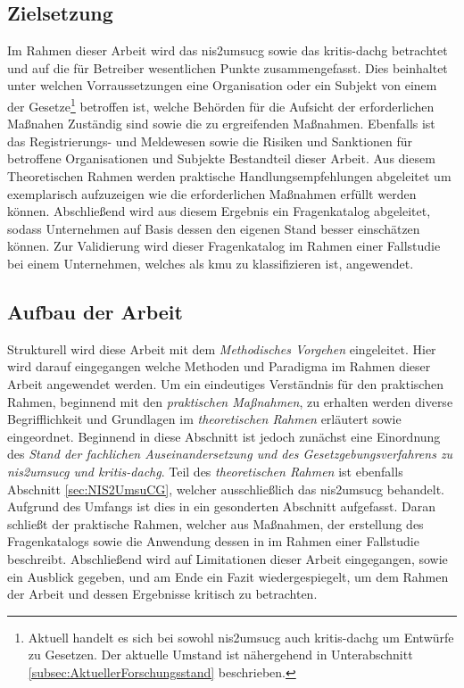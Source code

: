 \documentclass[11pt,a4paper,hidelinks]{article}   %
\begin{document}
    \subsection{Zielsetzung}                                                                %
        Im Rahmen dieser Arbeit wird das \gls{nis2umsucg} sowie das \gls{kritis-dachg} betrachtet und auf die für Betreiber wesentlichen Punkte zusammengefasst. Dies beinhaltet unter welchen Vorraussetzungen eine Organisation oder ein Subjekt von einem der Gesetze\footnote{Aktuell handelt es sich bei sowohl \gls{nis2umsucg} auch \gls{kritis-dachg} um Entwürfe zu Gesetzen. Der aktuelle Umstand ist nähergehend in Unterabschnitt \ref{subsec:AktuellerForschungsstand} beschrieben.} betroffen ist, welche Behörden für die Aufsicht der erforderlichen Maßnahen Zuständig sind sowie die zu ergreifenden Maßnahmen. Ebenfalls ist das Registrierungs- und Meldewesen sowie die Risiken und Sanktionen für betroffene Organisationen und Subjekte Bestandteil dieser Arbeit. Aus diesem Theoretischen Rahmen werden praktische Handlungsempfehlungen abgeleitet um exemplarisch aufzuzeigen wie die erforderlichen Maßnahmen erfüllt werden können. Abschließend wird aus diesem Ergebnis ein Fragenkatalog abgeleitet, sodass Unternehmen auf Basis dessen den eigenen Stand besser einschätzen können. Zur Validierung wird dieser Fragenkatalog im Rahmen einer Fallstudie bei einem Unternehmen, welches als \gls{kmu} zu klassifizieren ist, angewendet.
    \subsection{Aufbau der Arbeit}                                                          %
        Strukturell wird diese Arbeit mit dem \emph{Methodisches Vorgehen} eingeleitet. Hier wird darauf eingegangen welche Methoden und Paradigma im Rahmen dieser Arbeit angewendet werden. Um ein eindeutiges Verständnis für den praktischen Rahmen, beginnend mit den \emph{praktischen Maßnahmen}, zu erhalten werden diverse Begrifflichkeit und Grundlagen im \emph{theoretischen Rahmen} erläutert sowie eingeordnet. Beginnend in diese Abschnitt ist jedoch zunächst eine Einordnung des \emph{Stand der fachlichen Auseinandersetzung und des Gesetzgebungsverfahrens zu \gls{nis2umsucg} und \gls{kritis-dachg}}. Teil des \emph{theoretischen Rahmen} ist ebenfalls Abschnitt \ref{sec:NIS2UmsuCG}, welcher ausschließlich das \gls{nis2umsucg} behandelt. Aufgrund des Umfangs ist dies in ein gesonderten Abschnitt aufgefasst. Daran schließt der praktische Rahmen, welcher aus Maßnahmen, der erstellung des Fragenkatalogs sowie die Anwendung dessen in im Rahmen einer Fallstudie beschreibt. Abschließend wird auf Limitationen dieser Arbeit eingegangen, sowie ein Ausblick gegeben, und am Ende ein Fazit wiedergespiegelt, um dem Rahmen der Arbeit und dessen Ergebnisse kritisch zu betrachten.
    \newpage
\end{document}

